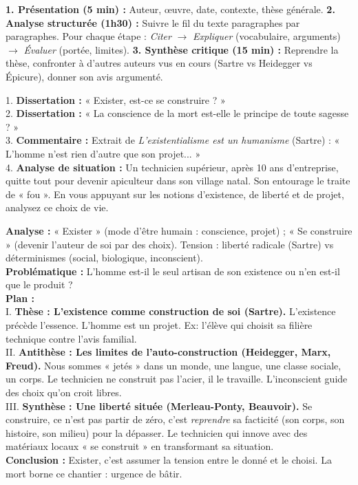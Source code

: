 \documentclass[11pt]{article}
\begin{document}
\begin{methode}
\textbf{1. Présentation (5 min) :} Auteur, œuvre, date, contexte, thèse générale.
\textbf{2. Analyse structurée (1h30) :} Suivre le fil du texte paragraphes par paragraphes. Pour chaque étape : \emph{Citer} $\rightarrow$ \emph{Expliquer} (vocabulaire, arguments) $\rightarrow$ \emph{Évaluer} (portée, limites).
\textbf{3. Synthèse critique (15 min) :} Reprendre la thèse, confronter à d'autres auteurs vus en cours (Sartre vs Heidegger vs Épicure), donner son avis argumenté.
\end{methode}

\begin{exercice}
1. \textbf{Dissertation :} « Exister, est-ce se construire ? »\\
2. \textbf{Dissertation :} « La conscience de la mort est-elle le principe de toute sagesse ? »\\
3. \textbf{Commentaire :} Extrait de \emph{L'existentialisme est un humanisme} (Sartre) : « L'homme n'est rien d'autre que son projet... »\\
4. \textbf{Analyse de situation :} Un technicien supérieur, après 10 ans d'entreprise, quitte tout pour devenir apiculteur dans son village natal. Son entourage le traite de « fou ». En vous appuyant sur les notions d'existence, de liberté et de projet, analysez ce choix de vie.
\end{exercice}

\begin{corrige}
\textbf{Analyse :} « Exister » (mode d'être humain : conscience, projet) ; « Se construire » (devenir l'auteur de soi par des choix). Tension : liberté radicale (Sartre) vs déterminismes (social, biologique, inconscient).\\
\textbf{Problématique :} L'homme est-il le seul artisan de son existence ou n'en est-il que le produit ?\\
\textbf{Plan :}\\
I. \textbf{Thèse : L'existence comme construction de soi (Sartre).} L'existence précède l'essence. L'homme est un projet. Ex: l'élève qui choisit sa filière technique contre l'avis familial.\\
II. \textbf{Antithèse : Les limites de l'auto-construction (Heidegger, Marx, Freud).} Nous sommes « jetés » dans un monde, une langue, une classe sociale, un corps. Le technicien ne construit pas l'acier, il le travaille. L'inconscient guide des choix qu'on croit libres.\\
III. \textbf{Synthèse : Une liberté située (Merleau-Ponty, Beauvoir).} Se construire, ce n'est pas partir de zéro, c'est \emph{reprendre} sa facticité (son corps, son histoire, son milieu) pour la dépasser. Le technicien qui innove avec des matériaux locaux « se construit » en transformant sa situation.\\
\textbf{Conclusion :} Exister, c'est assumer la tension entre le donné et le choisi. La mort borne ce chantier : urgence de bâtir.
\end{corrige}
\end{document}
